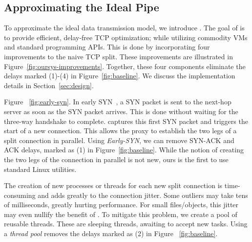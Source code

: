 \subsection{Approximating the Ideal Pipe}\label{sec:approx}

To approximate the ideal data transmission model, we introduce \textit{\oursys}.
The goal of \oursys is to provide efficient, delay-free TCP optimization; while utilizing commodity VMs and standard programming APIs. This is done by incorporating four improvements to the naive TCP split. These improvements are illustrated in Figure~\ref{fig:oursys-improvements}. Together, these four components eliminate the delays marked (1)-(4) in Figure~\ref{fig:baseline}. We discuss the implementation details in Section~\ref{sec:design}.



 \xspace Figure ~\ref{fig:early-syn}. In early SYN~\cite{ladiwala,siracusano2016miniproxy}, a SYN packet is sent to the next-hop server as soon as the SYN packet arrives. This is done without waiting for the three-way handshake to complete. \oursys captures this first SYN packet and triggers the start of a new connection. This allows the proxy to establish the two legs of a split connection in parallel. Using \textit{Early-SYN}, we can remove SYN-ACK and ACK delays, marked as (1) in Figure~\ref{fig:baseline}.
While the notion of creating the two legs of the connection in parallel is not new, ours is the first to use standard Linux utilities.

The creation of new processes or threads for each new split connection is time-consuming and adds greatly to the connection jitter. Some outliers may take tens of milliseconds, greatly hurting performance. For small files/objects, this jitter may even nullify the benefit of \oursys. To mitigate this problem, we create a pool of reusable threads. These are sleeping threads, awaiting to accept new tasks. Using a \textit{thread pool} removes the delays marked as (2) in Figure ~\ref{fig:baseline}.

